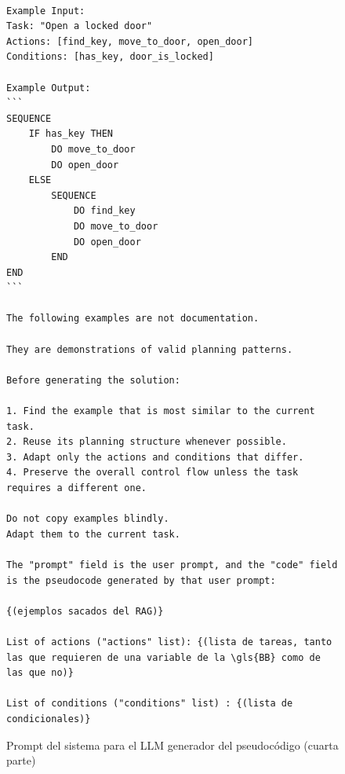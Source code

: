 \begin{figure}[htbp]
  \begin{verbatim}

Example Input:
Task: "Open a locked door"
Actions: [find_key, move_to_door, open_door]
Conditions: [has_key, door_is_locked]

Example Output:
```
SEQUENCE
    IF has_key THEN
        DO move_to_door
        DO open_door
    ELSE
        SEQUENCE
            DO find_key
            DO move_to_door
            DO open_door
        END
END
```

The following examples are not documentation.

They are demonstrations of valid planning patterns.

Before generating the solution:

1. Find the example that is most similar to the current task.
2. Reuse its planning structure whenever possible.
3. Adapt only the actions and conditions that differ.
4. Preserve the overall control flow unless the task requires a different one.

Do not copy examples blindly.
Adapt them to the current task.

The "prompt" field is the user prompt, and the "code" field is the pseudocode generated by that user prompt:

{(ejemplos sacados del RAG)}

List of actions ("actions" list): {(lista de tareas, tanto las que requieren de una variable de la \gls{BB} como de las que no)}

List of conditions ("conditions" list) : {(lista de condicionales)}
\end{verbatim}
  \caption{Prompt del sistema para el LLM generador del pseudocódigo (cuarta parte)}
\end{figure}